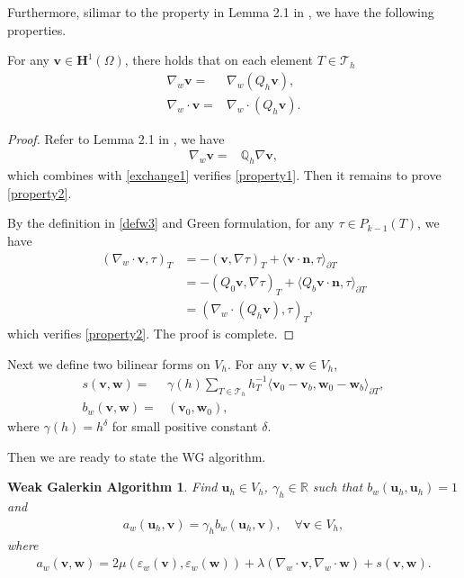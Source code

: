 \documentclass[leqno,CJK]{siamltex704}
\numberwithin{equation}{section}
\def\T{{\mathcal{T}}}
\def\dQ{{\mathbb{Q}}}
\def\sumT{\sum_{T\in\mathcal{T}_h}}     %
\def\bw{{\mathbf{w}}}
\def\bu{{\mathbf{u}}}
\def\bv{{\mathbf{v}}}
\def\bh{{\mathbf{H}}}
\def\bn{{\mathbf{n}}}
\newtheorem{algorithm1}{Weak Galerkin Algorithm}
\newcommand{\eps}{\varepsilon}
\newcommand{\Real}{\mathbb{R}}
\newcommand{\la}{\langle}
\newcommand{\ra}{\rangle_{\partial T}}
\begin{document}
Furthermore, silimar to the property in Lemma 2.1 in \cite{Ye2020}, we have the following properties.
\begin{lemma}
	For any $\bv\in\bh^1(\Omega)$, there holds that on each element $T\in\T_h$
	\begin{align}
		\nabla_w\bv =& \nabla_w(Q_h\bv),\label{property1}\\
		\nabla_w\cdot\bv =& \nabla_w\cdot(Q_h\bv).\label{property2}
	\end{align}
\end{lemma}
\begin{proof}
	Refer to Lemma 2.1 in \cite{Ye2020}, we have
	\begin{align}\label{exchange4}
		\nabla_w\bv =& \dQ_h\nabla\bv,
	\end{align}
	which combines with \eqref{exchange1} verifies \eqref{property1}. Then it remains to prove \eqref{property2}.
	
	By the definition in \eqref{defw3} and Green formulation, for any $\tau\in P_{k-1}(T)$, we have
	\begin{align*}
		(\nabla_w\cdot\bv,\tau)_T
		&=-(\bv,\nabla\tau)_T+\la\bv\cdot\bn,\tau
		\ra\\
		&=-(Q_0\bv,\nabla\tau)_T+\la Q_b\bv\cdot\bn,\tau
		\ra\\
		&=(\nabla_w\cdot(Q_h\bv),\tau)_T,
	\end{align*}
	which verifies \eqref{property2}. The proof is complete.
\end{proof}

Next we define two bilinear forms on $V_h$. For any $\bv,\bw\in V_h$,
\begin{align*}
	s(\bv,\bw)=&\gamma(h)\sumT h_T^{-1}\langle \bv_0-\bv_b, \bw_0-\bw_b\rangle_{\partial T},\\
	b_w(\bv,\bw)=&(\bv_0,\bw_0),
\end{align*}
where $\gamma(h)= h^{\delta}$ for small positive constant $\delta$.

Then we are ready to state the WG algorithm.
\begin{algorithm1}
	Find $\bu_h\in V_h$, $\gamma_h\in\Real$ such that $b_w(\bu_h,\bu_h)=1$ and
	\begin{eqnarray}\label{WGscheme}
		a_w(\bu_h,\bv)=\gamma_h b_w(\bu_h,\bv),\quad\forall \bv\in V_h,
	\end{eqnarray}
	where
	\begin{eqnarray*}
		a_w(\bv,\bw)=2\mu(\eps_w(\bv),\eps_w(\bw))+\lambda(\nabla_w\cdot \bv,\nabla_w\cdot\bw)+s(\bv,\bw).
	\end{eqnarray*}
\end{algorithm1}
\end{document}
